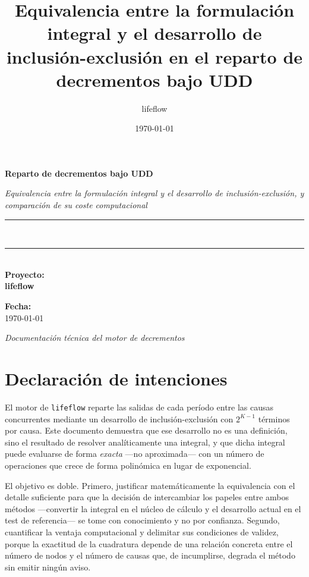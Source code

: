 \documentclass[a4paper, 12pt]{article}
\title{\textbf{Equivalencia entre la formulación integral y el desarrollo de inclusión-exclusión en el reparto de decrementos bajo UDD}}
\author{lifeflow}
\date{\today}
\begin{document}
\begin{titlepage}
\begin{center}
    \vspace*{1.5cm}
    \textbf{\Huge Reparto de decrementos bajo UDD}

    \vspace{0.5cm}
    \textit{\small Equivalencia entre la formulación integral y el desarrollo de inclusión-exclusión, y comparación de su coste computacional}

    \vspace{1cm}
    \rule{\textwidth}{0.3mm} \\[0.4cm]
    \rule{\textwidth}{0.3mm} \\[2cm]

    \textbf{\Large Proyecto:} \\[0.3cm]
    \textbf{lifeflow}

    \vspace{2cm}
    \textbf{\Large Fecha:} \\[0.3cm]
    \today

    \vfill
    \textit{\large Documentación técnica del motor de decrementos}
\end{center}
\end{titlepage}

\newpage

\section*{Declaración de intenciones}

El motor de \texttt{lifeflow} reparte las salidas de cada período entre las causas concurrentes mediante un desarrollo de inclusión-exclusión con $2^{K-1}$ términos por causa. Este documento demuestra que ese desarrollo no es una definición, sino el resultado de resolver analíticamente una integral, y que dicha integral puede evaluarse de forma \emph{exacta} —no aproximada— con un número de operaciones que crece de forma polinómica en lugar de exponencial.

El objetivo es doble. Primero, justificar matemáticamente la equivalencia con el detalle suficiente para que la decisión de intercambiar los papeles entre ambos métodos —convertir la integral en el núcleo de cálculo y el desarrollo actual en el test de referencia— se tome con conocimiento y no por confianza. Segundo, cuantificar la ventaja computacional y delimitar sus condiciones de validez, porque la exactitud de la cuadratura depende de una relación concreta entre el número de nodos y el número de causas que, de incumplirse, degrada el método sin emitir ningún aviso.
\end{document}
